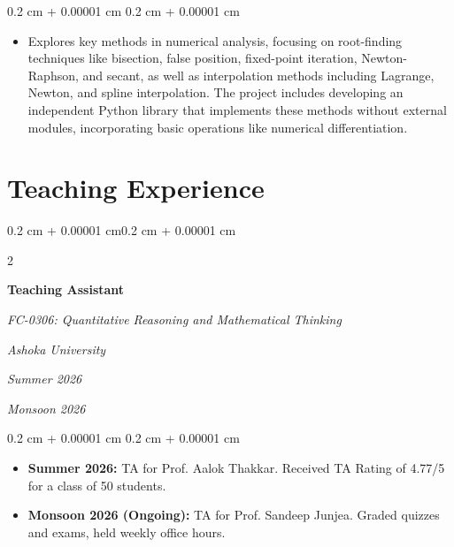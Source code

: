\documentclass[10pt, letterpaper]{article}
\newenvironment{highlights}{
    \begin{itemize}[
        topsep=0.10 cm,
        parsep=0.10 cm,
        partopsep=0pt,
        itemsep=0pt,
        leftmargin=0.4 cm + 10pt
    ]
}{
    \end{itemize}
} %
\newenvironment{onecolentry}{
    \begin{adjustwidth}{
        0.2 cm + 0.00001 cm
    }{
        0.2 cm + 0.00001 cm
    }
}{
    \end{adjustwidth}
} %
\newenvironment{twocolentry}[2][]{
    \begin{adjustwidth}{0.2 cm + 0.00001 cm}{0.2 cm + 0.00001 cm}
    \def\secondColumn{#2}
    \setcolumnwidth{\fill, 4.5 cm}
    \begin{paracol}{2}
}{
    \switchcolumn \raggedleft \secondColumn
    \end{paracol}
    \end{adjustwidth}
} %
\begin{document}
    \vspace{0.10 cm}
    \begin{onecolentry}
        \begin{highlights}
            \item Explores key methods in numerical analysis, focusing on root-finding techniques like bisection, false position, fixed-point iteration, Newton-Raphson, and secant, as well as interpolation methods including Lagrange, Newton, and spline interpolation. The project includes developing an independent Python library that implements these methods without external modules, incorporating basic operations like numerical differentiation.
        \end{highlights}
    \end{onecolentry}

        \vspace{0.2 cm}

 
    \section{Teaching Experience}
        \begin{twocolentry}{
        \textit{Ashoka University}    
            
        \textit{Summer 2026}
        
        \textit{Monsoon 2026}}
            \textbf{Teaching Assistant}

            \textit{FC-0306: Quantitative Reasoning and Mathematical Thinking}
    
        \end{twocolentry}
              


        \vspace{0.10 cm}
        \begin{onecolentry}
            \begin{highlights}
                \item \textbf{Summer 2026:} TA for Prof. Aalok Thakkar. Received TA Rating of 4.77/5 for a class of 50 students. 
                \item \textbf{Monsoon 2026 (Ongoing):} TA for Prof. Sandeep Junjea. Graded quizzes and exams, held weekly office hours. 
            \end{highlights}
        \end{onecolentry}


        \vspace{0.2 cm}
\end{document}
